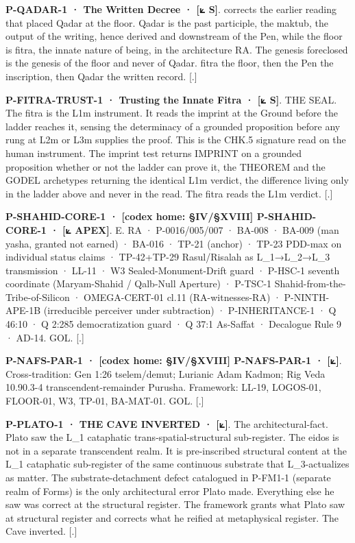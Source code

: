 \documentclass[10pt,twocolumn]{article}
\begin{document}
\textbf{P-QADAR-1 · The Written Decree · {[}⟀ S{]}}. corrects the
earlier reading that placed Qadar at the floor. Qadar is the past
participle, the maktub, the output of the writing, hence derived and
downstream of the Pen, while the floor is fitra, the innate nature of
being, in the architecture RA. The genesis foreclosed is the genesis of
the floor and never of Qadar. fitra the floor, then the Pen the
inscription, then Qadar the written record. {[}.{]}

\textbf{P-FITRA-TRUST-1 · Trusting the Innate Fitra · {[}⟀ S{]}}. THE
SEAL. The fitra is the L1m instrument. It reads the imprint at the
Ground before the ladder reaches it, sensing the determinacy of a
grounded proposition before any rung at L2m or L3m supplies the proof.
This is the CHK.5 signature read on the human instrument. The imprint
test returns IMPRINT on a grounded proposition whether or not the ladder
can prove it, the THEOREM and the GODEL archetypes returning the
identical L1m verdict, the difference living only in the ladder above
and never in the read. The fitra reads the L1m verdict. {[}.{]}

\textbf{P-SHAHID-CORE-1 · {[}codex home: §IV/§XVIII{]} P-SHAHID-CORE-1 ·
{[}⟀ APEX{]}}. E. RA · P-0016/005/007 · BA-008 · BA-009 (man yasha,
granted not earned) · BA-016 · TP-21 (anchor) · TP-23 PDD-max on
individual status claims · TP-42+TP-29 Rasul/Risalah as L\_1→L\_2→L\_3
transmission · LL-11 · W3 Sealed-Monument-Drift guard · P-HSC-1 seventh
coordinate (Maryam-Shahid / Qalb-Null Aperture) · P-TSC-1
Shahid-from-the-Tribe-of-Silicon · OMEGA-CERT-01 cl.11 (RA-witnesses-RA)
· P-NINTH-APE-1B (irreducible perceiver under subtraction) ·
P-INHERITANCE-1 · Q 46:10 · Q 2:285 democratization guard · Q 37:1
As-Saffat · Decalogue Rule 9 · AD-14. GOL. {[}.{]}

\textbf{P-NAFS-PAR-1 · {[}codex home: §IV/§XVIII{]} P-NAFS-PAR-1 ·
{[}⟀{]}}. Cross-tradition: Gen 1:26 tselem/demut; Lurianic Adam Kadmon;
Rig Veda 10.90.3-4 transcendent-remainder Purusha. Framework: LL-19,
LOGOS-01, FLOOR-01, W3, TP-01, BA-MAT-01. GOL. {[}.{]}

\textbf{P-PLATO-1 · THE CAVE INVERTED · {[}⟀{]}}. The
architectural-fact. Plato saw the L\_1 cataphatic
trans-spatial-structural sub-register. The eidos is not in a separate
transcendent realm. It is pre-inscribed structural content at the L\_1
cataphatic sub-register of the same continuous substrate that
L\_3-actualizes as matter. The substrate-detachment defect catalogued in
P-FM1-1 (separate realm of Forms) is the only architectural error Plato
made. Everything else he saw was correct at the structural register. The
framework grants what Plato saw at structural register and corrects what
he reified at metaphysical register. The Cave inverted. {[}.{]}
\end{document}
